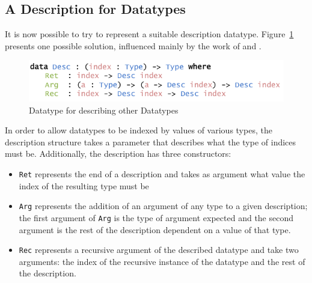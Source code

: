 \documentclass{ituthesis}
\begin{document}
\subsection{A Description for Datatypes}
\label{sub:ADescriptionforDatatypes}
It is now possible to try to represent a suitable description datatype. Figure~\ref{fig:descriptiondatatype} presents one possible solution, influenced mainly by the work of \cite{mcbride2010ornamental} and \cite{diehl2014eliminators}.

\begin{figure}[ht]
\begin{center}
    \includegraphics[scale=0.5]{Figures/ADescriptionforDatatypes.png}
\end{center}
\caption{Datatype for describing other Datatypes}
\label{fig:descriptiondatatype}
\end{figure}

In order to allow datatypes to be indexed by values of various types, the description structure takes a parameter that describes what the type of indices must be.
Additionally, the description has three constructors:
\begin{itemize}
  \item  \texttt{Ret} represents the end of a description and takes as argument what value the index of the resulting type must be
  \item  \texttt{Arg} represents the addition of an argument of any type to a given description; the first argument of \texttt{Arg} is the type of argument expected and the second argument is the rest of the description dependent on a value of that type.
  \item  \texttt{Rec} represents a recursive argument of the described datatype and take two arguments: the index of the recursive instance of the datatype and the rest of the description.
\end{itemize}
\end{document}
